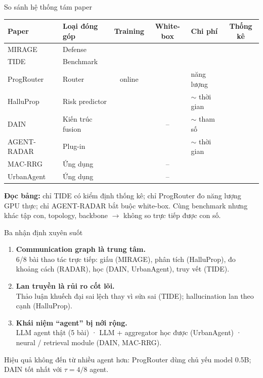 \documentclass[aspectratio=169,10pt]{beamer}
\newcommand{\yes}{\ding{51}}
\newcommand{\no}{\ding{55}}
\begin{document}
\begin{frame}{So sánh hệ thống tám paper}
  \centering
  \footnotesize
  \begin{tabular}{@{}l l c c l c@{}}
    \toprule
    Paper & Loại đóng góp & Training & White-box & Chi phí & Thống kê \\
    \midrule
    MIRAGE      & Defense          & \no    & \no  & \no              & \no \\
    TIDE        & Benchmark        & \no    & \no  & \no              & \yes \\
    ProgRouter  & Router           & online & \no  & \yes{} năng lượng & \no \\
    HalluProp   & Risk predictor   & \yes   & \no  & $\sim$ thời gian & \no \\
    DAIN        & Kiến trúc fusion & \yes   & --   & $\sim$ tham số   & \no \\
    AGENT-RADAR & Plug-in          & \no    & \yes & $\sim$ thời gian & \no \\
    MAC-RRG     & Ứng dụng         & \yes   & --   & \no              & \no \\
    UrbanAgent  & Ứng dụng         & \yes   & --   & \no              & \no \\
    \bottomrule
  \end{tabular}
  \vspace{6pt}

  \raggedright\small
  \textbf{Đọc bảng:} chỉ TIDE có kiểm định thống kê; chỉ ProgRouter đo năng lượng GPU thực;
  chỉ AGENT-RADAR bắt buộc white-box. Cùng benchmark nhưng khác tập con, topology, backbone
  $\to$ không so trực tiếp được con số.
\end{frame}

\begin{frame}{Ba nhận định xuyên suốt}
  \begin{enumerate}
    \item \textbf{Communication graph là trung tâm.}\\
      6/8 bài thao tác trực tiếp: giấu (MIRAGE), phân tích (HalluProp), đo khoảng cách (RADAR),
      học (DAIN, UrbanAgent), truy vết (TIDE).
    \item \textbf{Lan truyền là rủi ro cốt lõi.}\\
      Thảo luận khuếch đại sai lệch thay vì sửa sai (TIDE); hallucination lan theo cạnh (HalluProp).
    \item \textbf{Khái niệm “agent” bị nới rộng.}\\
      LLM agent thật (5 bài) · LLM + aggregator học được (UrbanAgent) ·
      neural / retrieval module (DAIN, MAC-RRG).
  \end{enumerate}
  \vspace{6pt}
  \begin{block}{}
    Hiệu quả không đến từ nhiều agent hơn: ProgRouter dùng chủ yếu model 0.5B;
    DAIN tốt nhất với $\tau = 4/8$ agent.
  \end{block}
\end{frame}
\end{document}
